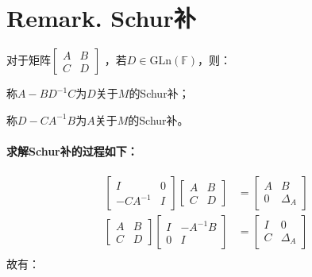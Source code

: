 \documentclass[cn,black,12pt,normal]{elegantnote}
\begin{document}
\section{Remark. Schur补}

对于矩阵$\begin{bmatrix}
            A & B \\
            C & D
        \end{bmatrix}$
，若$D \in \text{GLn}(\mathbb{F} )$，则：

称$A-BD^{-1}C$为$D$关于$M$的Schur补；

称$D-CA^{-1}B$为$A$关于$M$的Schur补。
\paragraph{求解Schur补的过程如下：}
\begin{align*}
    \begin{bmatrix}
        I & 0 \\
        -CA^{-1} & I
    \end{bmatrix}\begin{bmatrix}
        A & B \\
        C & D
    \end{bmatrix} & = \begin{bmatrix}
        A & B \\
        0 & \Delta_A
    \end{bmatrix} \\
    \begin{bmatrix}
        A & B \\
        C & D
    \end{bmatrix}\begin{bmatrix}
        I & -A^{-1}B \\
        0 & I
    \end{bmatrix} & = \begin{bmatrix}
        I & 0 \\
        C & \Delta_A
    \end{bmatrix} \\
\end{align*}
故有：
\end{document}
